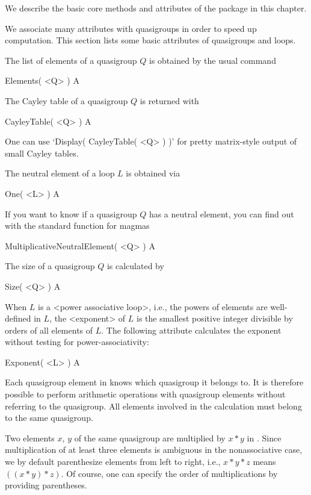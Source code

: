 
We describe the basic core methods and attributes of the {\LOOPS} package in this chapter.


We associate many attributes with quasigroups in order to speed up computation.
This section lists some basic attributes of quasigroups and loops.

The list of elements of a quasigroup $Q$ is obtained by the usual command

\>Elements( <Q> ) A

The Cayley table of a quasigroup $Q$ is returned with

\>CayleyTable( <Q> ) A

One can use `Display( CayleyTable( <Q> ) )' for pretty matrix-style output of
small Cayley tables.

The neutral element of a loop $L$ is obtained via

\>One( <L> ) A

If you want to know if a quasigroup $Q$ has a neutral element, you can find out
with the standard function for magmas

\>MultiplicativeNeutralElement( <Q> ) A

The size of a quasigroup $Q$ is calculated by

\>Size( <Q> ) A

When $L$ is a <power associative loop>, i.e., the powers of elements
are well-defined in $L$, the <exponent> of $L$ is the smallest
positive integer divisible by orders of all elements of $L$. The following
attribute calculates the exponent without testing for power-associativity:

\>Exponent( <L> ) A


Each quasigroup element in {\GAP} knows which quasigroup it belongs to. It is
therefore possible to perform arithmetic operations with quasigroup elements
without referring to the quasigroup. All elements involved in the calculation
must belong to the same quasigroup.

Two elements $x$, $y$ of the same quasigroup are multiplied by $x*y$ in {\GAP}.
Since multiplication of at least three elements is ambiguous in the
nonassociative case, we by default parenthesize elements from left to right,
i.e., $x*y*z$ means $((x*y)*z)$. Of course, one can specify the order of
multiplications by providing parentheses.

